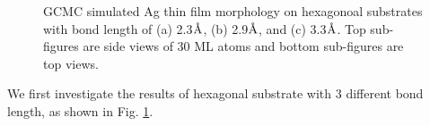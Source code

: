 \begingroup
\begin{figure}[!ht]
  \centering
  \label{Chap:Ag/ZnO:fig:5a}
  \label{Chap:Ag/ZnO:fig:5b}
  \label{Chap:Ag/ZnO:fig:5c}
\caption[GCMC simulated Ag thin film morphology on hexagonoal substrates.]{GCMC simulated Ag thin film morphology on hexagonoal substrates with bond length of (a) 2.3$\mbox{\normalfont\AA}$, (b) 2.9$\mbox{\normalfont\AA}$, and (c) 3.3$\mbox{\normalfont\AA}$. Top sub-figures are side views of 30 ML atoms and bottom sub-figures are top views.}
  \label{Chap:Ag/ZnO:fig5}
\end{figure}
\endgroup

We first investigate the results of hexagonal substrate with 3 different bond length, as shown in Fig. \ref{Chap:Ag/ZnO:fig5}. 